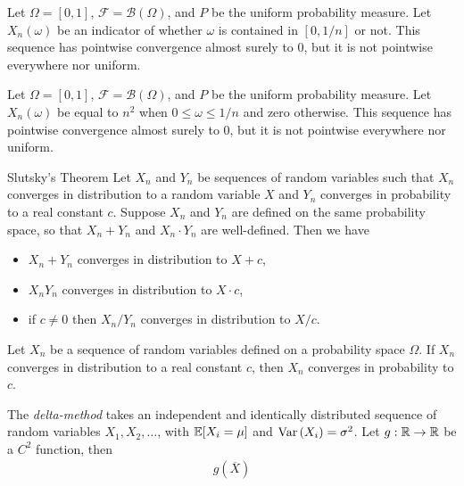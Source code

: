 \begin{exmp}
    Let $\Omega = [0, 1]$, $\mathcal{F} = \mathcal{B}(\Omega)$, and $P$ be the uniform probability measure. Let $X_n(\omega)$ be an indicator of whether $\omega$ is contained in $[0, 1/n]$ or not. This sequence has pointwise convergence almost surely to $0$, but it is not pointwise everywhere nor uniform.
\end{exmp}

\begin{exmp}
    Let $\Omega = [0, 1]$, $\mathcal{F} = \mathcal{B}(\Omega)$, and $P$ be the uniform probability measure. Let $X_n(\omega)$ be equal to $n^2$ when $0 \leq \omega \leq 1/n$ and zero otherwise. This sequence has pointwise convergence almost surely to $0$, but it is not pointwise everywhere nor uniform.
\end{exmp}

\begin{thm}{Slutsky's Theorem}\label{slutsky}\proofbreak
    Let $X_n$ and $Y_n$ be sequences of random variables such that $X_n$ converges in distribution to a random variable $X$ and $Y_n$ converges in probability to a real constant $c$. Suppose $X_n$ and $Y_n$ are defined on the same probability space, so that $X_n + Y_n$ and $X_n \cdot Y_n$ are well-defined. Then we have
    \begin{itemize}
        \item $X_n + Y_n$ converges in distribution to $X + c$,
        \item $X_nY_n$ converges in distribution to $X \cdot c$,
        \item if $c \neq 0$ then $X_n / Y_n$ converges in distribution to $X/c$.
    \end{itemize}
\end{thm}

\begin{lemma}
    Let $X_n$ be a sequence of random variables defined on a probability space $\Omega$. If $X_n$ converges in distribution to a real constant $c$, then $X_n$ converges in probability to $c$.
\end{lemma}

\begin{defn}
    The \emph{delta-method} takes an independent and identically distributed sequence of random variables $X_1, X_2, \ldots$, with $\operatorname{\mathbb{E}}\!\left[{X_i = \mu}\right]$ and $\operatorname{Var}\left(X_i\right) = \sigma^2$. Let $g: \mathbb{R} \to \mathbb{R}$ be a $C^2$ function, then
    \begin{align}
        g\left(\overline{X}\right)
    \end{align}
\end{defn}

